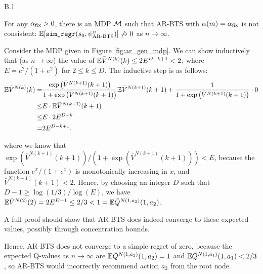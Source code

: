         \begin{customprop}{B.1}

            For any $\alpha_{\textnormal{fix}}>0$, there is an MDP $\mathcal{M}$ such that AR-BTS with $\alpha(m)=\alpha_{\textnormal{fix}}$ is not consistent: $\mathbb{E}[{\textnormal{\texttt{sim\_regr}}}(s_0,\psi^n_{\textnormal{AR-BTS}})] \not\to 0$ as $n\to\infty$. 
        \end{customprop}
        \begin{proofoutline}

            Consider the MDP given in Figure \ref{fig:ar_gen_mdp}. We can show inductively that (as $n\rightarrow\infty$) the value of $\mathbb{E}\bar{V}^{N(k)}(k)\leq 2E^{D-k+1} < 2$, where $E=e^2/(1+e^2)$ for $2\leq k \leq D$. The inductive step is as follows:
            \begin{align}
                \mathbb{E}\bar{V}^{N(k)}(k) =& \frac{\exp\left(\bar{V}^{N(k+1)}(k+1)\right)}{1+\exp\left(\bar{V}^{N(k+1)}(k+1)\right)} \mathbb{E}\bar{V}^{N(k+1)}(k+1) 
                    + \frac{1}{1+\exp\left(\bar{V}^{N(k+1)}(k+1)\right)} \cdot 0 \\
                    \leq& E \cdot \mathbb{E} \bar{V}^{N(k+1)}(k+1) \\
                    \leq& E \cdot 2E^{D-k} \\
                    =& 2E^{D-k+1}.
            \end{align}

            where we know that $\exp\left(\bar{V}^{N(k+1)}(k+1)\right)/\left(1+\exp\left(\bar{V}^{N(k+1)}(k+1)\right)\right) < E$, because the function $e^x/(1+e^x)$ is monotonically increasing in $x$, and $\bar{V}^{N(k+1)}(k+1) < 2$. Hence, by choosing an integer $D$ such that $D-1 \geq \log(1/3) / \log(E)$, we have $\mathbb{E}\bar{V}^{N(2)}(2)=2E^{D-1}\leq 2/3 < 1 = \mathbb{E}\bar{Q}^{N(1,a_2)}(1,a_2)$. 

            A full proof should show that AR-BTS does indeed converge to these expected values, possibly through concentration bounds. 

            Hence, AR-BTS does not converge to a simple regret of zero, because the expected Q-values as $n\rightarrow\infty$ are $\mathbb{E}\bar{Q}^{N(1,a_2)}(1,a_2)=1$ and $\mathbb{E}\bar{Q}^{N(1,a_1)}(1,a_1)<2/3$, so AR-BTS would incorrectly recommend action $a_2$ from the root node. 
        \end{proofoutline}




